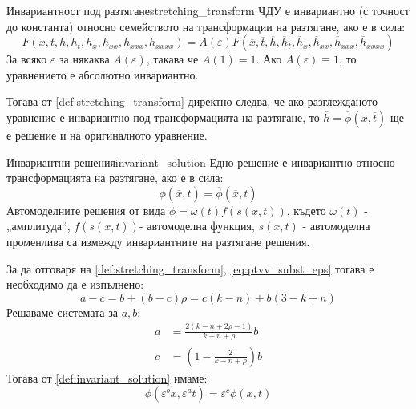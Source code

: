 \begin{definition}{Инвариантност под разтягане}{stretching_transform}
    ЧДУ е инвариантно (с точност до константа) относно семейството на трансформации на разтягане, ако е в сила:
    \begin{equation*}
        \label{eq:stretching_transform}
        F(x,t,h,{h_t},{h_x},{h_{xx}},{h_{xxx}},{h_{xxxx}}) = A(\varepsilon )F(\overline x ,\overline t ,\overline h ,\overline h \overline {_t} ,{\overline h _{\overline x }},{\overline h _{\overline {xx} }},{\overline h _{\overline {xxx} }},{\overline h _{\overline {xxxx} }})
    \end{equation*}
    За всяко  $\varepsilon$ за някаква $A(\varepsilon)$, такава че $A(1) = 1$. Ако $A(\varepsilon) \equiv 1$, то уравнението е абсолютно инвариантно.
\end{definition}
Тогава от \autoref{def:stretching_transform} директно следва, че ако разглежданото уравнение е инвариантно под трансформацията на разтягане, то $\overline{h} = \overline{\phi}(\overline{x}, \overline{t})$ ще е решение и на оригиналното уравнение.
\begin{definition}{Инвариантни решения}{invariant_solution}
    Едно решение е инвариантно относно трансформацията на разтягане, ако е в сила:
    \begin{equation*}
        \label{eq:invariant_equation}
        \phi (\overline x ,\overline t ) = \overline \phi  (\overline x ,\overline t )
    \end{equation*}
    Автомоделните решения от вида $\phi  = \omega (t)f(s(x,t))$, където $\omega(t)$ - „амплитуда“,  $f(s(x,t))$- автомоделна функция,  $s(x,t)$ - автомоделна променлива са измежду инвариантните на разтягане решения.
\end{definition}
\noindent За да отговаря на \autoref{def:stretching_transform}, \autoref{eq:ptvv_subst_eps} тогава е необходимо да е изпълнено:
\begin{equation*}
    a - c = b + (b - c)\rho  = c(k - n) + b(3 - k + n)
\end{equation*}
Решаваме системата за $a, b$:
\begin{align*}
    a &= \frac{{2\left( {k - n + 2\rho  - 1} \right)}}{{k - n + \rho }}b \\
    c &= \left( {1 - \frac{2}{{k - n + \rho }}} \right)b
\end{align*}
Тогава от \autoref{def:invariant_solution} имаме:
\begin{equation*}
    \phi ({\varepsilon ^b}x,{\varepsilon ^a}t) = {\varepsilon ^c}\phi (x,t)
\end{equation*}
